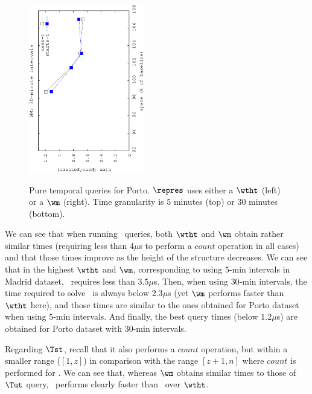 \begin{figure}[!ht]
\begin{center}
			{\includegraphics[angle=-90,width=0.45\textwidth]{figures_synt/porto_t30mwm.eps}}
	\end{center}
	\vspace{-0.5cm}
	\caption{Pure temporal queries for Porto. $\repres$ uses either a $\wtht$ (left) or a $\wm$ (right). 
		Time granularity is $5$ minutes (top) or $30$ minutes (bottom).}
	\label{fig:portost_topk}
\end{figure}



We can see that when running \Tut\ queries, both $\wtht$ and $\wm$ obtain rather similar times (requiring less than 4$\mu$s 
to perform a $count$ operation in all cases) and that those times improve as the height of the structure decreases. We can see 
that in the highest $\wtht$ and $\wm$, corresponding to using $5$-min intervals in Madrid dataset, \Tut\ requires less
than $3.5\mu$s. Then, when using $30$-min intervals, the time required to solve \Tut\ is always below $2.3\mu$s (yet
$\wm$ performs faster than $\wtht$ here), and those times are similar to the ones obtained for Porto dataset when
using $5$-min intervals. And finally, the best query times (below $1.2\mu$s) are obtained for Porto dataset with 
$30$-min intervals.

Regarding $\Tst$, recall that it also performs a $count$ operation, but within a smaller range ($[1,z]$) in comparison with the range
$[z+1,n]$ where  $count$ is performed for \Tut. We can see that, whereas $\wm$ obtains similar times to those of 
$\Tut$ query,  \Tst\ performs clearly faster than \Tut\ over $\wtht$.







